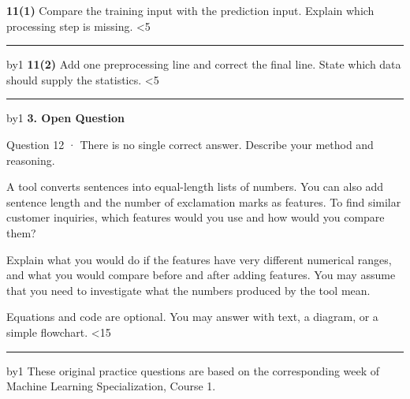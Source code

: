 \documentclass[11pt,a4paper]{article}
\newcommand{\parttitle}[2]{{\large\bfseries\color{ink} #1}\par{\small #2}\par\vspace{5mm}}
\newcommand{\answerlines}[1]{\foreachline{#1}}
\newcommand{\foreachline}[1]{\linecount=0\loop\ifnum\linecount<#1\vspace{8mm}\par{\color{rulegray}\hrule}\advance\linecount by1\repeat}
\begin{document}
\textbf{11(1)} Compare the training input with the prediction input. Explain which processing step is missing.
\answerlines{5}
\vspace{6mm}
\textbf{11(2)} Add one preprocessing line and correct the final line. State which data should supply the statistics.
\answerlines{5}
\vspace{6mm}
\newpage
\parttitle{3. Open Question}{Question 12 · There is no single correct answer. Describe your method and reasoning.}
A tool converts sentences into equal-length lists of numbers. You can also add sentence length and the number of exclamation marks as features. To find similar customer inquiries, which features would you use and how would you compare them?
\par\vspace{3mm}
Explain what you would do if the features have very different numerical ranges, and what you would compare before and after adding features. You may assume that you need to investigate what the numbers produced by the tool mean.
\par\vspace{3mm}
{\small Equations and code are optional. You may answer with text, a diagram, or a simple flowchart.}
\answerlines{15}
\vfill{\footnotesize These original practice questions are based on the corresponding week of Machine Learning Specialization, Course 1.}
\end{document}
